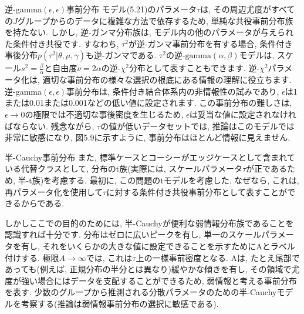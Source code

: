 \documentclass[10pt,dvipdfmx,a4]{beamer}
\begin{document}
\begin{frame}{逆-gamma$(\epsilon,\epsilon)$事前分布}
モデル(5.21)のパラメータ$\tau$は, その周辺尤度がすべての$J$グループからのデータに複雑な方法で依存するため, 単純な共役事前分布族を持たない.
しかし, 逆-ガンマ分布族は, モデル内の他のパラメータが与えられた条件付き共役です.
すなわち, $\tau^2$が逆-ガンマ事前分布を有する場合, 条件付き事後分布$p(\tau^2|\theta,\mu, \gamma)$も逆-ガンマである.
$\tau^2$の逆-$\text{gamma}(\alpha,\beta)$モデルは, スケール$s^2=\frac{\beta}{\alpha}$と自由度$\nu=2\alpha$の逆-$\chi^2$分布として表すこともできます.
逆-$\chi^2$パラメータ化は, 適切な事前分布の様々な選択の根底にある情報の理解に役立ちます.
逆-gamma$(\epsilon,\epsilon)$事前分布は, 条件付き結合体系内の非情報性の試みであり, $\epsilon$は1または0.01または0.001などの低い値に設定されます.
この事前分布の難しさは, $\epsilon \rightarrow0$の極限では不適切な事後密度を生じるため, $\epsilon$は妥当な値に設定されなければならない.
残念ながら, $\tau$の値が低いデータセットでは, 推論はこのモデルでは非常に敏感になり, 図5.9に示すように, 事前分布はほとんど情報に見えません.
\end{frame}


\begin{frame}{半-Cauchy事前分布}
また, 標準ケースとコーシーがエッジケースとして含まれている代替クラスとして, 分布のt族(実際には, スケールパラメータ$\tau$が正であるため, 半-t族)を考慮する.
最初に, この問題のtモデルを考慮した.
なぜなら, これは, 再パラメータ化を使用して$\tau$に対する条件付き共役事前分布として表すことができるからである.

しかしここでの目的のためには, 半-Cauchyが便利な弱情報分布族であることを認識すれば十分です.
分布はゼロに広いピークを有し, 単一のスケールパラメータを有し, それをいくらかの大きな値に設定できることを示すためにAとラベル付けする.
極限$A\rightarrow \infty$では, これは$\tau$上の一様事前密度となる.
Aは, たとえ尾部であっても(例えば, 正規分布の半分とは異なり)緩やかな傾きを有し, その領域で尤度が強い場合にはデータを支配することができるため, 弱情報と考える事前分布を表す.
少数のグループから推測される分散パラメータのための半-Cauchyモデルを考察する(推論は弱情報事前分布の選択に敏感である).
\end{frame}

\end{document}
